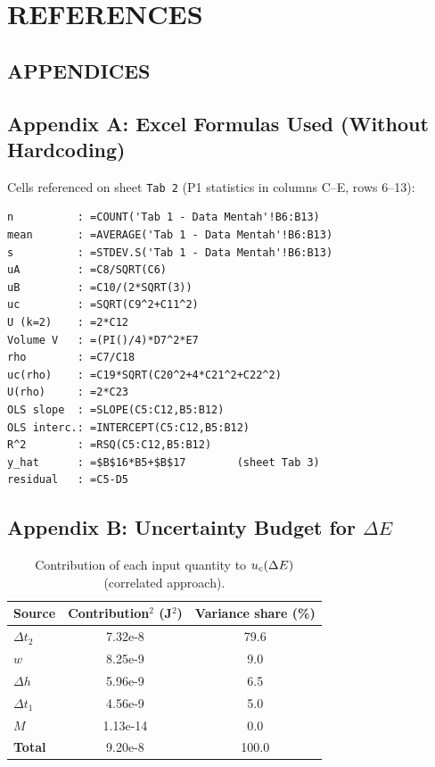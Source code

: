 \documentclass[a4paper, 12pt]{article}
\begin{document}
    \section{REFERENCES}
    \printbibliography[heading=none]

    \newpage
    \begin{center}
        \section{APPENDICES}
    \end{center}

    \appendix

    \subsection*{Appendix A: Excel Formulas Used (Without Hardcoding)}
    \noindent Cells referenced on sheet \texttt{Tab 2} (P1 statistics in columns C--E, rows 6--13):

\begin{lstlisting}
n          : =COUNT('Tab 1 - Data Mentah'!B6:B13)
mean       : =AVERAGE('Tab 1 - Data Mentah'!B6:B13)
s          : =STDEV.S('Tab 1 - Data Mentah'!B6:B13)
uA         : =C8/SQRT(C6)
uB         : =C10/(2*SQRT(3))
uc         : =SQRT(C9^2+C11^2)
U (k=2)    : =2*C12
Volume V   : =(PI()/4)*D7^2*E7
rho        : =C7/C18
uc(rho)    : =C19*SQRT(C20^2+4*C21^2+C22^2)
U(rho)     : =2*C23
OLS slope  : =SLOPE(C5:C12,B5:B12)
OLS interc.: =INTERCEPT(C5:C12,B5:B12)
R^2        : =RSQ(C5:C12,B5:B12)
y_hat      : =$B$16*B5+$B$17        (sheet Tab 3)
residual   : =C5-D5
\end{lstlisting}

    \subsection*{Appendix B: Uncertainty Budget for $\Delta E$}
    \begin{table}[H]
    \centering
    \singlespacing
    \caption{Contribution of each input quantity to $\uc(\Delta E)$ (correlated approach).}
    \label{tab:budgetE}
    \small
    \begin{tabular}{l S[table-format=1.2e-1] S[table-format=3.1]}
    \toprule
    \textbf{Source} & {Contribution$^2$ (J$^2$)} & {Variance share (\%)}\\
    \midrule
    $\Delta t_2$ & 7.32e-8 & 79.6\\
    $w$ & 8.25e-9 & 9.0\\
    $\Delta h$ & 5.96e-9 & 6.5\\
    $\Delta t_1$ & 4.56e-9 & 5.0\\
    $M$ & 1.13e-14 & 0.0\\
    \midrule
    \textbf{Total} & 9.20e-8 & 100.0\\
    \bottomrule
    \end{tabular}
    \end{table}
\end{document}

